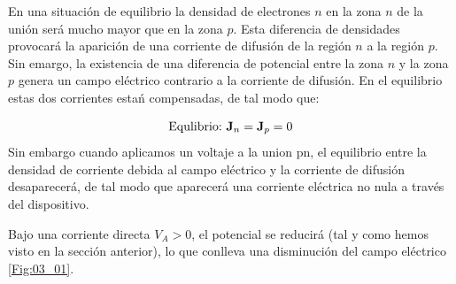 En una situación de equilibrio la densidad de electrones $n$ en la zona $n$ de la unión será mucho mayor que en la zona $p$. Esta diferencia de densidades provocará la aparición de una corriente de difusión de la región $n$ a la región $p$. Sin emargo, la existencia de una diferencia de potencial entre la zona $n$ y la zona $p$ genera un campo eléctrico contrario a la corriente de difusión. En el equilibrio estas dos corrientes estań compensadas, de tal modo que:

\begin{equation}
    \text{Equlibrio:} \ \mathbf{J}_n = \mathbf{J}_p = 0
\end{equation}
Sin embargo cuando aplicamos un voltaje a la union pn, el equilibrio entre la densidad de corriente debida al campo eléctrico y la corriente de difusión desaparecerá, de tal modo que aparecerá una corriente eléctrica no nula a través del dispositivo. 

Bajo una corriente directa $V_A>0$, el potencial se reducirá (tal y como hemos visto en la sección anterior), lo que conlleva una disminución del campo eléctrico \cref{Fig:03_01}.

